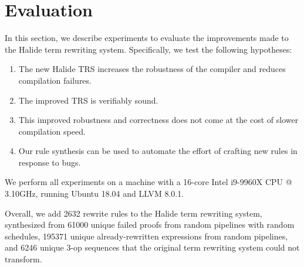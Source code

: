 \documentclass[sigplan,10pt,review,anonymous]{acmart}\settopmatter{printfolios=true,printccs=false,printacmref=false}
\newcommand{\NumRulesSynthesized}{{\color{red} 2632}\xspace}
\newcommand{\NumOpSequences}{{\color{red} 6246}\xspace}
\newcommand{\NumFailureExamples}{{\color{red} 61000}\xspace}
\newcommand{\NumSimplifiedExpressions}{{\color{red} 195371}\xspace}
\begin{document}
\section{Evaluation}
In this section, we describe experiments to evaluate the improvements made to the Halide term rewriting system.  Specifically, we
test the following hypotheses:
\begin{enumerate}
\item The new Halide TRS increases the robustness of the compiler and reduces compilation failures.
\item The improved TRS is verifiably sound.
\item This improved robustness and correctness does not come at the cost of slower compilation speed.
\item Our rule synthesis can be used to automate the effort of crafting new rules in response to bugs.
\end{enumerate}

We perform all experiments on a machine with a 16-core Intel i9-9960X CPU @ 3.10GHz,
running Ubuntu 18.04 and LLVM 8.0.1.



Overall, we add \NumRulesSynthesized rewrite rules to the Halide term rewriting system, synthesized
from \NumFailureExamples unique failed proofs from random pipelines with random schedules, \NumSimplifiedExpressions
unique already-rewritten expressions from random pipelines, and \NumOpSequences unique 3-op sequences
that the original term rewriting system could not transform.  
\end{document}
